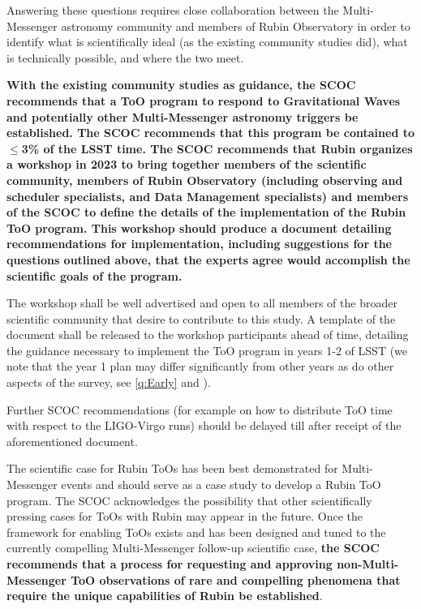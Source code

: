Answering these questions requires close collaboration between the Multi-Messenger astronomy community and members of Rubin Observatory in order to identify what is scientifically ideal (as the existing community studies did), what is technically possible, and where the two meet. 

{\bf With the existing community studies as guidance, the SCOC recommends that a ToO program to respond to Gravitational Waves and potentially other Multi-Messenger astronomy triggers be established. The SCOC recommends that this program be contained to $\leq$3\% of the LSST time. The SCOC recommends that Rubin organizes a workshop in 2023 to bring together members of the scientific community, members of Rubin Observatory (including observing and scheduler specialists, and Data Management specialists) and members of the SCOC to define the details of the implementation of the Rubin ToO program. This workshop should produce a document detailing recommendations for implementation, including suggestions for the questions outlined above, that the experts agree would accomplish the scientific goals of the program.}


The workshop shall be well advertised and open to all members of the broader scientific community that desire to contribute to this study. A template of the document shall be released to the workshop participants ahead of time, detailing the guidance necessary to implement the ToO program in years 1-2 of LSST (we note that the year 1 plan may differ significantly from other years as do other aspects of the survey, see \autoref{q:Early} and ). 

Further SCOC recommendations (for example on how to distribute ToO time with respect to the LIGO-Virgo runs) should be delayed till after receipt of the aforementioned document. 

The scientific case for Rubin ToOs has been best demonstrated for Multi-Messenger events and should serve as a case study to develop a Rubin ToO program. The SCOC acknowledges the possibility that other scientifically pressing cases for ToOs with Rubin may appear in the future. Once the framework for enabling ToOs exists and has been designed and tuned to the currently compelling Multi-Messenger follow-up scientific case, {\bf the SCOC recommends that a process for requesting and approving non-Multi-Messenger ToO observations of rare and compelling phenomena that require the unique capabilities of Rubin be established}.
